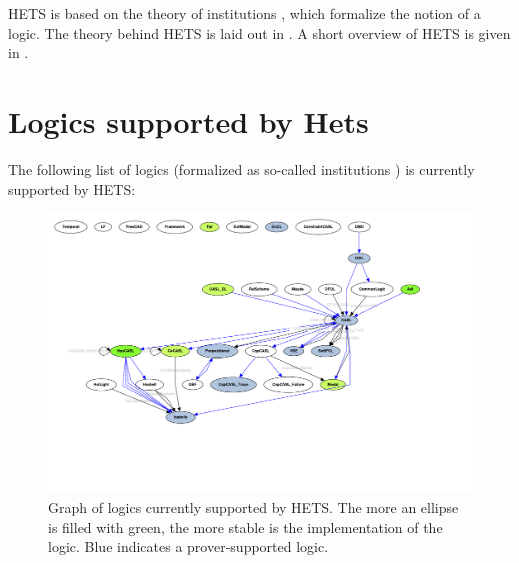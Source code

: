 \documentclass{article}
\newcommand{\normalTEXTSC}[2]{{#1\scriptsize#2}}
\newcommand     {\Hets}{\normalTEXTSC{H}{ETS}\xspace}
\begin{document}
\Hets is based on the theory of institutions \cite{GoguenBurstall92},
which formalize the notion of a logic. The theory behind \Hets is laid
out in \cite{Habil}. A short overview of \Hets is given in
\cite{MossakowskiEA06,MossakowskiEtAl07b}.


\section{Logics supported by Hets}

The following list of logics (formalized as so-called institutions
\cite{GoguenBurstall92}) is currently supported by \Hets:

\begin{figure}
  \begin{center}
    \includegraphics[scale=0.4]{LogicGraph}
  \end{center}
\caption{Graph of logics currently supported by \Hets. The more an
ellipse is filled with green, the more stable is the implementation of the logic. Blue indicates a prover-supported logic.}
\label{fig:LogicGraph}
\end{figure}
\end{document}
